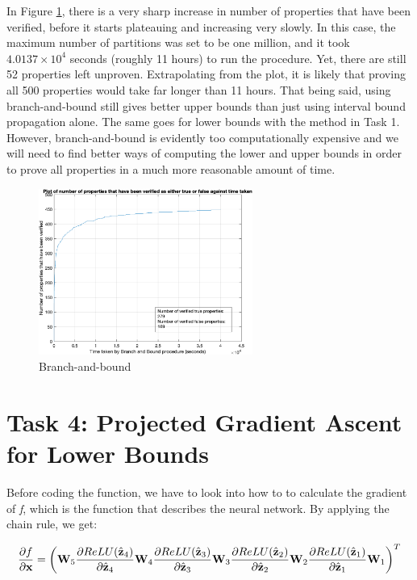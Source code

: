 \documentclass[11pt]{article}
\begin{document}
In Figure \ref{fig:fig2}, there is a very sharp increase in number of properties that have been verified, before it starts plateauing and increasing very slowly. In this case, the maximum number of partitions was set to be one million, and it took $4.0137\times10^4$ seconds (roughly 11 hours) to run the procedure. Yet, there are still 52 properties left unproven. Extrapolating from the plot, it is likely that proving all 500 properties would take far longer than 11 hours. That being said, using branch-and-bound still gives better upper bounds than just using interval bound propagation alone. The same goes for lower bounds with the method in Task 1. However, branch-and-bound is evidently too computationally expensive and we will need to find better ways of computing the lower and upper bounds in order to prove all properties in a much more reasonable amount of time.

\begin{figure}[h]
	\centering
    \includegraphics[width=7cm]{Task 3 (1 million) v2.png}
	\caption{Branch-and-bound}
	\label{fig:fig2}
\end{figure}

\section{Task 4: Projected Gradient Ascent for Lower Bounds}
\label{sec:Task 4}

Before coding the function, we have to look into how to to calculate the gradient of \emph{f}, which is the function that describes the neural network. By applying the chain rule, we get: 

\[
\pdv{f}{\textbf{x}} = {\left({\textbf{W}_5} {\pdv{ReLU(\hat{ \textbf{z}}_{4})}{\hat{ \textbf{z}}_{4}}} {\textbf{W}_4} {\pdv{ReLU(\hat{ \textbf{z}}_{3})}{\hat{ \textbf{z}}_{3}}} {\textbf{W}_3} {\pdv{ReLU(\hat{ \textbf{z}}_{2})}{\hat{ \textbf{z}}_{2}}} {\textbf{W}_2} {\pdv{ReLU(\hat{ \textbf{z}}_{1})}{\hat{ \textbf{z}}_{1}}} {\textbf{W}_1}\right)}^T
\]
\end{document}
